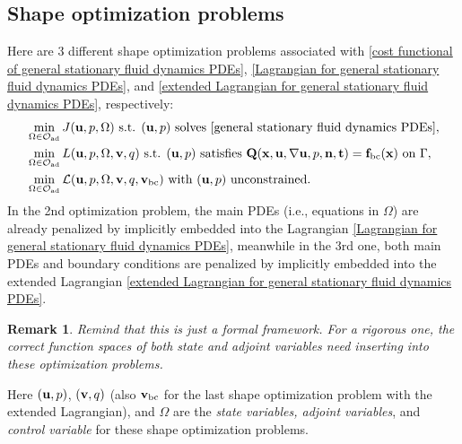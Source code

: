 \documentclass[oneside,11pt]{book}
\numberwithin{equation}{section}
\newtheorem{remark}{Remark}[section]
\begin{document}
\subsection{Shape optimization problems}
Here are 3 different shape optimization problems associated with \eqref{cost functional of general stationary fluid dynamics PDEs}, \eqref{Lagrangian for general stationary fluid dynamics PDEs}, and \eqref{extended Lagrangian for general stationary fluid dynamics PDEs}, respectively:
\begin{align*}
    &\min_{\Omega\in\mathcal{O}_{\rm ad}} J({\bf u},p,\Omega) \mbox{ s.t. } ({\bf u},p) \mbox{ solves \eqref{general stationary fluid dynamics PDEs}},\\
    &\min_{\Omega\in\mathcal{O}_{\rm ad}} L({\bf u},p,\Omega,{\bf v},q) \mbox{ s.t. } ({\bf u},p) \mbox{ satisfies } {\bf Q}({\bf x},{\bf u},\nabla{\bf u},p,{\bf n},{\bf t}) = {\bf f}_{\rm bc}({\bf x}) \mbox{ on } \Gamma,\\
    &\min_{\Omega\in\mathcal{O}_{\rm ad}} \mathcal{L}({\bf u},p,\Omega,{\bf v},q,{\bf v}_{\rm bc}) \mbox{ with } ({\bf u},p) \mbox{ unconstrained}.
\end{align*}
In the 2nd optimization problem, the main PDEs (i.e., equations in $\Omega$) are already penalized by implicitly embedded into the Lagrangian \eqref{Lagrangian for general stationary fluid dynamics PDEs}, meanwhile in the 3rd one, both main PDEs and boundary conditions are penalized by implicitly embedded into the extended Lagrangian \eqref{extended Lagrangian for general stationary fluid dynamics PDEs}.
\begin{remark}
    Remind that this is just a formal framework. For a rigorous one, the correct function spaces of both state and adjoint variables need inserting into these optimization problems.
\end{remark}
Here $({\bf u},p)$, $({\bf v},q)$ (also ${\bf v}_{\rm bc}$ for the last shape optimization problem with the extended Lagrangian), and $\Omega$ are the \textit{state variables, adjoint variables}, and \textit{control variable} for these shape optimization problems.
\end{document}
